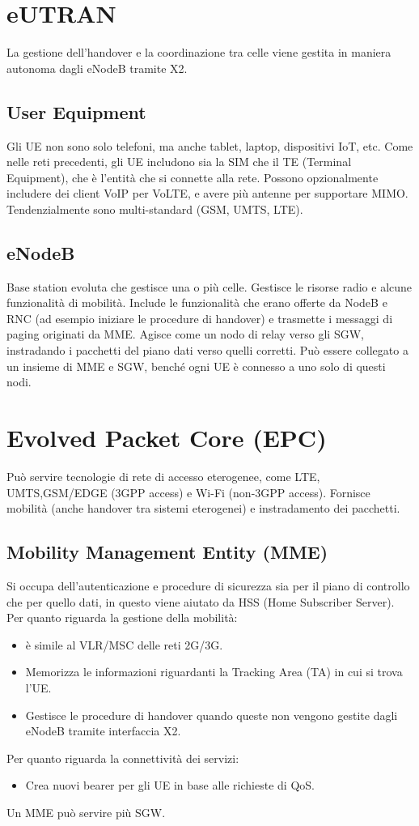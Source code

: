 \section{eUTRAN}
La gestione dell'handover e la coordinazione tra celle viene gestita in maniera autonoma dagli eNodeB tramite X2.
\subsection{User Equipment}
Gli UE non sono solo telefoni, ma anche tablet, laptop, dispositivi IoT, etc.
Come nelle reti precedenti, gli UE includono sia la SIM che il TE (Terminal Equipment), che è l'entità che si connette alla rete.
Possono opzionalmente includere dei client VoIP per VoLTE, e avere più antenne per supportare MIMO.
Tendenzialmente sono multi-standard (GSM, UMTS, LTE).
\subsection{eNodeB}
Base station evoluta che gestisce una o più celle. Gestisce le risorse radio e alcune funzionalità di mobilità.
Include le funzionalità che erano offerte da NodeB e RNC (ad esempio iniziare le procedure di handover) e trasmette i messaggi di paging originati da MME.
Agisce come un nodo di relay verso gli SGW, instradando i pacchetti del piano dati verso quelli corretti.
Può essere collegato a un insieme di MME e SGW, benché ogni UE è connesso a uno solo di questi nodi.
\section{Evolved Packet Core (EPC)}
Può servire tecnologie di rete di accesso eterogenee, come LTE, UMTS,GSM/EDGE (3GPP access) e Wi-Fi (non-3GPP access).
Fornisce mobilità (anche handover tra sistemi eterogenei) e instradamento dei pacchetti.
\subsection{Mobility Management Entity (MME)}
Si occupa dell'autenticazione e procedure di sicurezza sia per il piano di controllo che per quello dati, in questo viene aiutato da HSS (Home Subscriber Server).\\
Per quanto riguarda la gestione della mobilità:
\begin{itemize}
	\item è simile al VLR/MSC delle reti 2G/3G.
	\item Memorizza le informazioni riguardanti la Tracking Area (TA) in cui si trova l'UE.
	\item Gestisce le procedure di handover quando queste non vengono gestite dagli eNodeB tramite interfaccia X2.
\end{itemize}
Per quanto riguarda la connettività dei servizi:
\begin{itemize}
	\item Crea nuovi bearer per gli UE in base alle richieste di QoS.
\end{itemize}
Un MME può servire più SGW.
